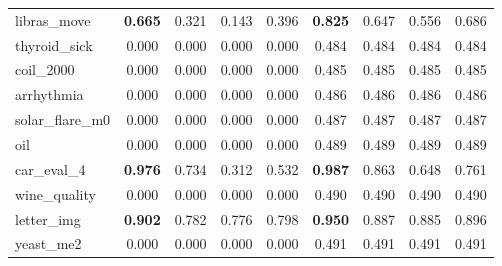 \begin{figure}[ht]
\begin{tabular}{p{22mm}|*4{p{14mm}}|*4{p{14mm}}}
        libras\_move&\multicolumn{1}{c}{\textbf{0.665}}&\multicolumn{1}{c}{0.321}&\multicolumn{1}{c}{0.143}&\multicolumn{1}{c|}{0.396}&\multicolumn{1}{c}{\textbf{0.825}}&\multicolumn{1}{c}{0.647}&\multicolumn{1}{c}{0.556}&\multicolumn{1}{c}{0.686}\\
        thyroid\_sick&\multicolumn{1}{c}{0.000}&\multicolumn{1}{c}{0.000}&\multicolumn{1}{c}{0.000}&\multicolumn{1}{c|}{0.000}&\multicolumn{1}{c}{0.484}&\multicolumn{1}{c}{0.484}&\multicolumn{1}{c}{0.484}&\multicolumn{1}{c}{0.484}\\
        coil\_2000&\multicolumn{1}{c}{0.000}&\multicolumn{1}{c}{0.000}&\multicolumn{1}{c}{0.000}&\multicolumn{1}{c|}{0.000}&\multicolumn{1}{c}{0.485}&\multicolumn{1}{c}{0.485}&\multicolumn{1}{c}{0.485}&\multicolumn{1}{c}{0.485}\\
        arrhythmia&\multicolumn{1}{c}{0.000}&\multicolumn{1}{c}{0.000}&\multicolumn{1}{c}{0.000}&\multicolumn{1}{c|}{0.000}&\multicolumn{1}{c}{0.486}&\multicolumn{1}{c}{0.486}&\multicolumn{1}{c}{0.486}&\multicolumn{1}{c}{0.486}\\
        solar\_flare\_m0&\multicolumn{1}{c}{0.000}&\multicolumn{1}{c}{0.000}&\multicolumn{1}{c}{0.000}&\multicolumn{1}{c|}{0.000}&\multicolumn{1}{c}{0.487}&\multicolumn{1}{c}{0.487}&\multicolumn{1}{c}{0.487}&\multicolumn{1}{c}{0.487}\\
        oil&\multicolumn{1}{c}{0.000}&\multicolumn{1}{c}{0.000}&\multicolumn{1}{c}{0.000}&\multicolumn{1}{c|}{0.000}&\multicolumn{1}{c}{0.489}&\multicolumn{1}{c}{0.489}&\multicolumn{1}{c}{0.489}&\multicolumn{1}{c}{0.489}\\
        car\_eval\_4&\multicolumn{1}{c}{\textbf{0.976}}&\multicolumn{1}{c}{0.734}&\multicolumn{1}{c}{0.312}&\multicolumn{1}{c|}{0.532}&\multicolumn{1}{c}{\textbf{0.987}}&\multicolumn{1}{c}{0.863}&\multicolumn{1}{c}{0.648}&\multicolumn{1}{c}{0.761}\\
        wine\_quality&\multicolumn{1}{c}{0.000}&\multicolumn{1}{c}{0.000}&\multicolumn{1}{c}{0.000}&\multicolumn{1}{c|}{0.000}&\multicolumn{1}{c}{0.490}&\multicolumn{1}{c}{0.490}&\multicolumn{1}{c}{0.490}&\multicolumn{1}{c}{0.490}\\
        letter\_img&\multicolumn{1}{c}{\textbf{0.902}}&\multicolumn{1}{c}{0.782}&\multicolumn{1}{c}{0.776}&\multicolumn{1}{c|}{0.798}&\multicolumn{1}{c}{\textbf{0.950}}&\multicolumn{1}{c}{0.887}&\multicolumn{1}{c}{0.885}&\multicolumn{1}{c}{0.896}\\
        yeast\_me2&\multicolumn{1}{c}{0.000}&\multicolumn{1}{c}{0.000}&\multicolumn{1}{c}{0.000}&\multicolumn{1}{c|}{0.000}&\multicolumn{1}{c}{0.491}&\multicolumn{1}{c}{0.491}&\multicolumn{1}{c}{0.491}&\multicolumn{1}{c}{0.491}\\

\end{tabular}
\end{figure}
